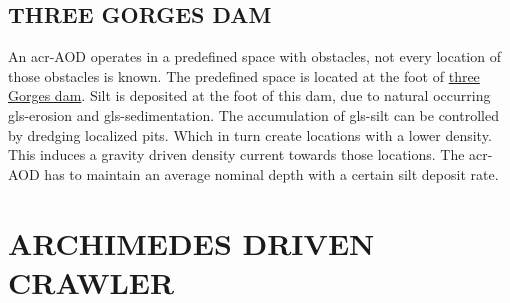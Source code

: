 \subsection{THREE GORGES DAM}\label{sec:usecase3}
An \gls{acr-AOD} operates in a predefined space with obstacles, not every location of those obstacles is known. The predefined space is located at the foot of \href{https://www.google.nl/maps/place/Three+Gorges+Dam/@30.8263416,111.0118356,16z/data=!4m2!3m1!1s0x368476d5e9a340d9:0xa017b4d524bd9d6c}{three Gorges dam}. Silt is deposited at the foot of this dam, due to natural occurring \gls{gls-erosion} and \gls{gls-sedimentation}. The accumulation of \gls{gls-silt} can be controlled by dredging localized pits. Which in turn create locations with a lower density. This induces a gravity driven density current towards those locations. The \gls{acr-AOD} has to maintain an average nominal depth with a certain silt deposit rate.

\section{ARCHIMEDES DRIVEN CRAWLER}
